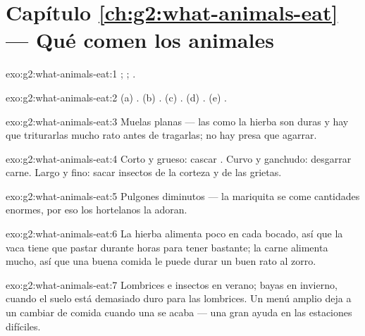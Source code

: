 \section*{Capítulo \ref{ch:g2:what-animals-eat} --- Qué comen los animales}

\begin{solution}{exo:g2:what-animals-eat:1}
; ; .
\end{solution}

\begin{solution}{exo:g2:what-animals-eat:2}
(a) . (b) . (c) . (d) . (e)
.
\end{solution}

\begin{solution}{exo:g2:what-animals-eat:3}
Muelas planas --- las  como la hierba son duras y hay que
triturarlas mucho rato antes de tragarlas; no hay presa que agarrar.
\end{solution}

\begin{solution}{exo:g2:what-animals-eat:4}
Corto y grueso: cascar . Curvo y ganchudo: desgarrar carne.
Largo y fino: sacar insectos de la corteza y de las grietas.
\end{solution}

\begin{solution}{exo:g2:what-animals-eat:5}
Pulgones diminutos --- la mariquita se come cantidades enormes, por
eso los hortelanos la adoran.
\end{solution}

\begin{solution}{exo:g2:what-animals-eat:6}
La hierba alimenta poco en cada bocado, así que la vaca tiene que
pastar durante horas para tener bastante; la carne alimenta mucho, así
que una buena comida le puede durar un buen rato al zorro.
\end{solution}

\begin{solution}{exo:g2:what-animals-eat:7}
Lombrices e insectos en verano; bayas en invierno, cuando el suelo
está demasiado duro para las lombrices. Un menú amplio deja a un
 cambiar de comida cuando una se acaba --- una gran ayuda en
las estaciones difíciles.
\end{solution}

